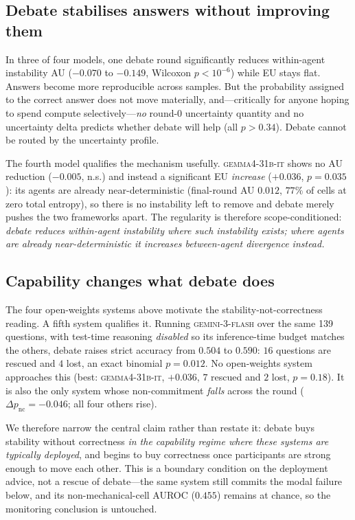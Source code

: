 \documentclass[sigconf,anonymous,review]{acmart}
\begin{document}
\subsection{Debate stabilises answers without improving them}

In three of four models, one debate round significantly reduces within-agent
instability AU ($-0.070$ to $-0.149$, Wilcoxon $p<10^{-6}$) while EU stays
flat. Answers become more reproducible across samples. But the probability
assigned to the correct answer does not move materially, and---critically for
anyone hoping to spend compute selectively---\emph{no} round-0 uncertainty
quantity and no uncertainty delta predicts whether debate will help
(all $p>0.34$). Debate cannot be routed by the uncertainty profile.

The fourth model qualifies the mechanism usefully.
\textsc{gemma4-31b-it} shows no AU reduction ($-0.005$, n.s.) and instead a
significant EU \emph{increase} ($+0.036$, $p=0.035$): its agents are already
near-deterministic (final-round AU $0.012$, $77\%$ of cells at zero total
entropy), so there is no instability left to remove and debate merely pushes
the two frameworks apart. The regularity is therefore scope-conditioned:
\emph{debate reduces within-agent instability where such instability exists;
where agents are already near-deterministic it increases between-agent
divergence instead.}

\subsection{Capability changes what debate does}
\label{sec:capability}

The four open-weights systems above motivate the stability-not-correctness
reading. A fifth system qualifies it. Running \textsc{gemini-3-flash} over
the same 139 questions, with test-time reasoning \emph{disabled} so its
inference-time budget matches the others, debate raises strict accuracy from
$0.504$ to $0.590$: $16$ questions are rescued and $4$ lost, an exact
binomial $p = 0.012$. No open-weights system approaches this
(best: \textsc{gemma4-31b-it}, $+0.036$, $7$ rescued and $2$ lost,
$p = 0.18$). It is also the only system whose non-commitment \emph{falls}
across the round ($\Delta p_{\mathrm{nc}} = -0.046$; all four others rise).

We therefore narrow the central claim rather than restate it: debate buys
stability without correctness \emph{in the capability regime where these
systems are typically deployed}, and begins to buy correctness once
participants are strong enough to move each other. This is a boundary
condition on the deployment advice, not a rescue of debate---the same system
still commits the modal failure below, and its non-mechanical-cell AUROC
($0.455$) remains at chance, so the monitoring conclusion is untouched.
\end{document}
